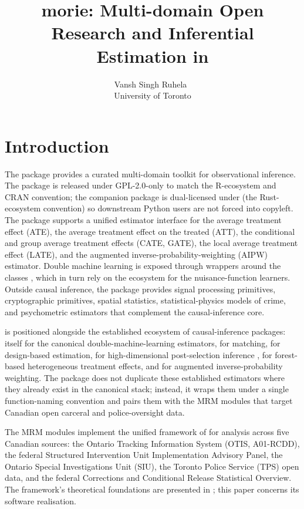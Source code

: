 \documentclass[article,shortnames,nojss]{jss}
\title{morie: Multi-domain Open Research and Inferential Estimation in \proglang{R}}
\author{Vansh Singh Ruhela~\orcidlink{0009-0004-1750-3592}\\University of Toronto}
\newcommand{\OTIS}{\textsf{OTIS}}
\newcommand{\SIU}{\textsf{SIU}}
\newcommand{\TPS}{\textsf{TPS}}
\begin{document}
\sloppy

\section{Introduction}
\label{sec:intro}

The  package  provides a curated
multi-domain toolkit for observational inference. The
 package is released under GPL-2.0-only to match the
R-ecosystem and CRAN convention; the companion
 package \citep{Ruhela2026MoriePy} is
dual-licensed under  (the Rust-ecosystem
convention) so downstream Python users are not forced into
copyleft.  The package supports a
unified estimator interface for the average treatment effect
(ATE), the average treatment effect on the treated (ATT), the
conditional and group average treatment effects (CATE, GATE), the
local average treatment effect (LATE), and the augmented
inverse-probability-weighting (AIPW) estimator. Double machine
learning is exposed through wrappers around the 
classes \citep{Bach2024DoubleML}, which in turn rely on the
 ecosystem \citep{Lang2019mlr3} for the nuisance-function
learners. Outside causal inference, the package provides signal
processing primitives, cryptographic primitives, spatial statistics,
statistical-physics models of crime, and psychometric estimators
that complement the causal-inference core.

 is positioned alongside the established 
ecosystem of causal-inference packages:  itself
\citep{Bach2024DoubleML} for the canonical double-machine-learning
estimators,  for matching,  for
design-based estimation,  for high-dimensional
post-selection inference \citep{ChernozhukovHansenSpindler2016hdm},
 for forest-based heterogeneous treatment effects, and
 for augmented inverse-probability weighting. The
package does not duplicate these established estimators where they
already exist in the canonical  stack; instead, it
wraps them under a single function-naming convention and pairs
them with the MRM modules that target Canadian open carceral and
police-oversight data.

The MRM modules implement the unified framework of
\citet{Ruhela2026MRM} for analysis across five Canadian sources:
the Ontario Tracking Information System (\OTIS, A01-RCDD), the
federal Structured Intervention Unit Implementation Advisory
Panel, the Ontario Special Investigations Unit (\SIU), the Toronto
Police Service (\TPS) open data, and the federal Corrections and
Conditional Release Statistical Overview. The framework's
theoretical foundations are presented in \citet{Ruhela2026MRM};
this paper concerns its  software realisation.
\end{document}
